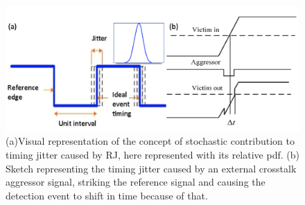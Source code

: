 \begin{figure}[hbtp]
\centering
\includegraphics[width=1\textwidth]{RandomCrosstalk}
\caption{(a)Visual representation of the concept of stochastic contribution to timing jitter caused by RJ, here represented with its relative pdf.
(b) Sketch representing the timing jitter caused by an external crosstalk aggressor signal, striking the reference signal and causing the detection event to shift in time because of that.}
\label{RandomIMG}
\end{figure}


